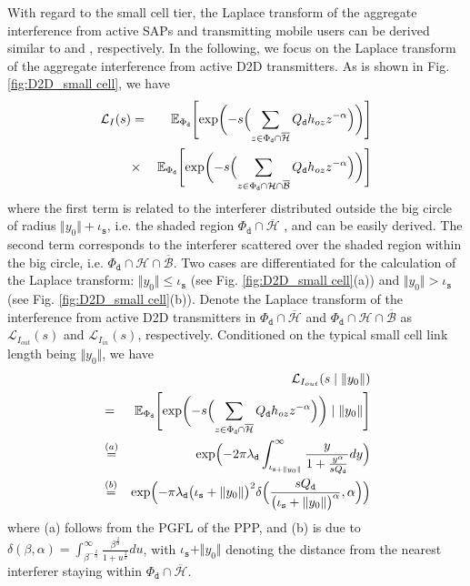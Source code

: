 \documentclass[twocolumn,english]{IEEEtran}
\theoremstyle{plain}
\theoremstyle{definition}
\begin{document}
With regard to the small cell tier, the Laplace transform of the aggregate
interference from active SAPs and transmitting mobile users can be
derived similar to  and ,
respectively. In the following, we focus on the Laplace transform
of the aggregate interference from active D2D transmitters. As is
shown in Fig. \ref{fig:D2D_small cell}, we have
\begin{eqnarray}
\mathcal{L}_{I}(s) & = & \mathbb{E}_{\Phi_{\mathtt{d}}}\Biggl[\exp\biggl(-s\Bigl(\sum_{z\in\Phi_{\mathtt{d}}\cap\overline{\mathcal{H}}}Q_{\mathtt{d}}h_{oz}z^{-\alpha}\Bigr)\biggr)\Biggr]\nonumber \\
 & \times & \mathbb{E}_{\Phi_{\mathtt{d}}}\Biggl[\exp\biggl(-s\Bigl(\sum_{z\in\Phi_{\mathtt{d}}\cap\mathcal{H}\cap\overline{\mathcal{B}}}Q_{\mathtt{d}}h_{oz}z^{-\alpha}\Bigr)\biggr)\Biggr]\label{eq:50}
\end{eqnarray}
where the first term is related to the interferer distributed outside
the big circle of radius $\Vert y_{0}\Vert+\iota_{\mathtt{s}}$, i.e.
the shaded region $\Phi_{\mathtt{d}}\cap\overline{\mathcal{H}}$ ,
and can be easily derived. The second term corresponds to the interferer
scattered over the shaded region within the big circle, i.e. $\Phi_{\mathtt{d}}\cap\mathcal{H}\cap\overline{\mathcal{B}}$.
Two cases are differentiated for the calculation of the Laplace transform:
$\Vert y_{0}\Vert\leq\iota_{\mathtt{s}}$ (see Fig. \ref{fig:D2D_small cell}(a))
and $\Vert y_{0}\Vert>\iota_{\mathtt{s}}$ (see Fig. \ref{fig:D2D_small cell}(b)).
Denote the Laplace transform of the interference from active D2D transmitters
in $\Phi_{\mathtt{d}}\cap\overline{\mathcal{H}}$ and $\Phi_{\mathtt{d}}\cap\mathcal{H}\cap\overline{\mathcal{B}}$
as $\mathcal{L}_{I_{out}}(s)$ and $\mathcal{L}_{I_{in}}(s)$, respectively.
Conditioned on the typical small cell link length being $\Vert y_{0}\Vert$,
we have
\begin{eqnarray}
 &  & \mathcal{L}_{I_{out}}(s\mid\Vert y_{0}\Vert)\nonumber \\
 & = & \mathbb{E}_{\Phi_{\mathtt{d}}}\Biggl[\exp\biggl(-s\Bigl(\sum_{z\in\Phi_{\mathtt{d}}\cap\overline{\mathcal{H}}}Q_{\mathtt{d}}h_{oz}z^{-\alpha}\Bigr)\biggr)\mid\Vert y_{0}\Vert\Biggr]\nonumber \\
 & \overset{(a)}{=} & \exp\Bigl(-2\pi\lambda_{\mathtt{d}}\int_{\iota_{\mathit{\mathtt{s}}+\Vert y_{0}\Vert}}^{\infty}\frac{y}{1+\frac{y^{\alpha}}{sQ_{\mathtt{d}}}}dy\Bigr)\nonumber \\
 & \overset{(b)}{=} & \exp\Bigl(-\pi\lambda_{\mathtt{d}}\bigl(\iota_{\mathtt{s}}+\Vert y_{0}\Vert\bigr)^{2}\delta\Bigl(\frac{sQ_{\mathtt{d}}}{\bigl(\iota_{\mathtt{s}}+\Vert y_{0}\Vert\bigr)^{\alpha}},\alpha\Bigr)\Bigr)\label{eq:I_out}
\end{eqnarray}
where (a) follows from the PGFL of the PPP, and (b) is due to $\delta\left(\beta,\alpha\right)=\int_{\beta^{-\frac{2}{\alpha}}}^{\infty}\frac{\beta^{\frac{2}{\alpha}}}{1+u^{\frac{2}{\alpha}}}du$,
with $\iota_{\mathtt{s}}+\Vert y_{0}\Vert$ denoting the distance
from the nearest interferer staying within $\Phi_{\mathtt{d}}\cap\overline{\mathcal{H}}$.
\end{document}
